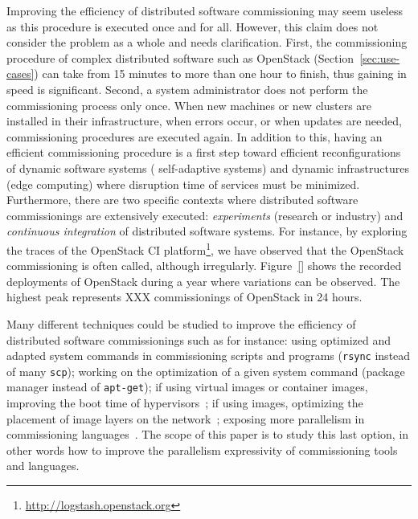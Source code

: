 Improving the efficiency of distributed software commissioning may
seem useless as this procedure is executed once and for all. However,
this claim does not consider the problem as a whole and needs
clarification.
%
First, the commissioning procedure of complex distributed software
such as OpenStack (Section~\ref{sec:use-cases}) can take from 15
minutes to more than one hour to finish, thus gaining in speed is
significant. Second, a system administrator does not perform the
commissioning process only once. When new machines or new clusters are
installed in their infrastructure, when errors occur, or when updates
are needed, commissioning procedures are executed again. In addition
to this, having an efficient commissioning procedure is a first step
toward efficient reconfigurations of dynamic software systems (\eg
self-adaptive systems) and dynamic infrastructures (\eg edge
computing) where disruption time of services must be minimized.
Furthermore, there are two specific contexts where distributed
software commissionings are extensively executed: \emph{experiments}
(research or industry) and \emph{continuous integration} of
distributed software systems. For instance, by exploring the traces of
the OpenStack CI
platform\footnote{\url{http://logstash.openstack.org}}, we have
observed that the OpenStack commissioning is often called, although
irregularly. Figure~\ref{} shows the recorded deployments of OpenStack
during a year where variations can be observed. The highest peak
represents XXX commissionings of OpenStack in 24 hours.
%

Many different techniques could be studied to improve the efficiency
of distributed software commissionings such as for instance: using
optimized and adapted system commands in commissioning scripts and
programs (\eg \texttt{rsync} instead of many \texttt{scp}); working on
the optimization of a given system command (\eg \nix package manager
instead of \texttt{apt-get}); if using virtual images or container
images, improving the boot time of
hypervisors~\cite{nguyen:hal-02172288}; if using \docker images,
optimizing the placement of image layers on the
network~\cite{darrous:hal-01745405}; exposing more parallelism in
commissioning languages~\cite{dicosmo:hal-01233489}. The scope of this
paper is to study this last option, in other words how to improve the
parallelism expressivity of commissioning tools and languages.


